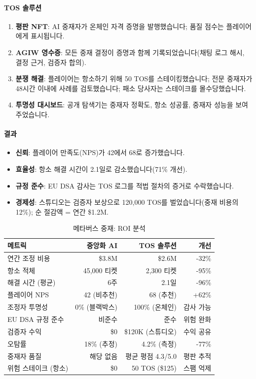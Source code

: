 \documentclass[11pt]{article}
\begin{document}
\paragraph{TOS 솔루션}
\begin{enumerate}[noitemsep]
  \item \textbf{평판 NFT}: AI 중재자가 온체인 자격 증명을 발행했습니다; 품질 점수는 플레이어에게 표시됩니다.
  \item \textbf{AGIW 영수증}: 모든 중재 결정이 증명과 함께 기록되었습니다(채팅 로그 해시, 결정 근거, 검증자 합의).
  \item \textbf{분쟁 해결}: 플레이어는 항소하기 위해 50 TOS를 스테이킹했습니다; 전문 중재자가 48시간 이내에 사례를 검토했습니다; 패소 당사자는 스테이크를 몰수당했습니다.
  \item \textbf{투명성 대시보드}: 공개 탐색기는 중재자 정확도, 항소 성공률, 중재자 성능을 보여주었습니다.
\end{enumerate}

\paragraph{결과}
\begin{itemize}[noitemsep]
  \item \textbf{신뢰}: 플레이어 만족도(NPS)가 42에서 68로 증가했습니다.
  \item \textbf{효율성}: 항소 해결 시간이 2.1일로 감소했습니다(71\% 개선).
  \item \textbf{규정 준수}: EU DSA 감사는 TOS 로그를 적법 절차의 증거로 수락했습니다.
  \item \textbf{경제성}: 스튜디오는 검증자 보상으로 120,000 TOS를 벌었습니다(중재 비용의 12\%); 순 절감액 = 연간 \$1.2M.
\end{itemize}

\begin{table}[H]
\centering
\caption{메타버스 중재: ROI 분석}
\label{tab:metaverse-roi}
\begin{tabular}{@{}lrrr@{}}
\toprule
\textbf{메트릭} & \textbf{중앙화 AI} & \textbf{TOS 솔루션} & \textbf{개선} \\ \midrule
연간 조정 비용 & \$3.8M & \$2.6M & -32\% \\
항소 적체 & 45,000 티켓 & 2,300 티켓 & -95\% \\
해결 시간 (평균) & 6주 & 2.1일 & -96\% \\
플레이어 NPS & 42 (비추천) & 68 (추천) & +62\% \\
조정자 투명성 & 0\% (블랙박스) & 100\% (온체인) & 감사 가능 \\
EU DSA 규정 준수 & 비준수 & 준수 & 위험 완화 \\
검증자 수익 & \$0 & \$120K (스튜디오) & 수익 공유 \\
오탐률 & 18\% (추정) & 4.2\% (측정) & -77\% \\
중재자 품질 & 해당 없음 & 평균 평점 4.3/5.0 & 평판 추적 \\
위험 스테이크 (항소) & \$0 & 50 TOS (\$125) & 스팸 억제 \\
\bottomrule
\end{tabular}
\end{table}
\end{document}
